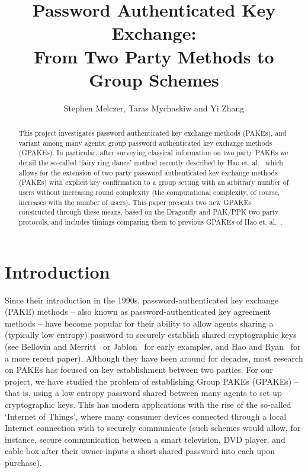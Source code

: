 \documentclass{amsart}
\author{Stephen Melczer, Taras Mychaskiw and Yi Zhang}
\title{Password Authenticated Key Exchange:\\ From Two Party Methods to Group Schemes}
\theoremstyle{remark}
\begin{document}
\begin{abstract}
This project investigates password authenticated key exchange methods (PAKEs), and variant among many agents:
group password authenticated key exchange methods (GPAKEs).  In 
particular, after surveying classical information on two party PAKEs we detail the so-called `fairy ring dance' method recently described by 
Hao et. al.~\cite{HaYiChSh15} which allows for the extension of two party password authenticated key exchange 
methods (PAKEs) with explicit key confirmation to a group setting with an arbitrary number of users without
increasing round complexity (the computational complexity, of course, increases with the number of users).  
This paper presents two new GPAKEs constructed through these means, based on the 
Dragonfly and PAK/PPK two party protocols, and includes timings comparing them to previous GPAKEs of
Hao et. al.~\cite{HaYiChSh15}.
\end{abstract}

\maketitle


\section{Introduction}

Since their introduction in the 1990s, password-authenticated key exchange (PAKE) methods -- 
also known as password-authenticated key agreement methods -- have become popular for their 
ability to allow agents sharing a (typically low entropy) password to securely establish shared 
cryptographic keys (see Bellovin and Merritt~\cite{BeMe92} or Jablon~\cite{Ja96} for early examples, 
and Hao and Ryan~\cite{HaRy2010} for a more recent paper).  Although they have been around for decades, 
most research on PAKEs has focused on key establishment between two parties.  For our project, we 
have studied the problem of establishing Group PAKEs (GPAKEs) -- that is, using a low entropy password 
shared between many agents to set up cryptographic keys.  This has modern applications with the rise
of the so-called `Internet of Things', where many consumer devices connected through a local Internet 
connection wish to securely communicate (such schemes would allow, for instance, secure communication 
between a smart television, DVD player, and cable box after their owner inputs a short shared password 
into each upon purchase).
\\
\end{document}
